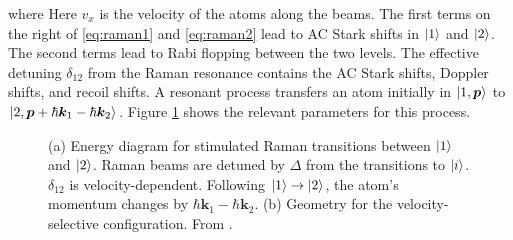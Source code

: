 \documentclass[reprint,
nofootinbib,
amsmath,amssymb,
aps]{revtex4-1}
\newcommand{\f}[2]{\frac{#1}{#2}}
\newcommand{\lb}{\left[}
\newcommand{\rb}{\right]}
\begin{document}
where  
Here $v_x$ is the velocity of the atoms along the beams. The first terms on the right of \eqref{eq:raman1} and \eqref{eq:raman2} lead to AC Stark shifts in $\ket{1}$ and $\ket{2}$. The second terms lead to Rabi flopping between the two levels. The effective detuning $\delta_{12}$ from the Raman resonance contains the AC Stark shifts, Doppler shifts, and recoil shifts. A resonant process transfers an atom initially in $\ket{1,\bm{p}}$ to $\ket{2, \bm{p} + \hbar \bm{k}_1 - \hbar \bm{k}_2}$. Figure \ref{fig:Raman} shows the relevant parameters for this process. 
 

\begin{figure}
	\quad
	\caption{(a) Energy diagram for stimulated Raman transitions between $\ket{1}$ and $\ket{2}$. Raman beams are detuned by $\Delta$ from the transitions to $\ket{i}$. $\delta_{12}$ is velocity-dependent. Following $\ket{1} \to \ket{2}$, the atom's momentum changes by $\hbar \bm{k}_1 - \hbar \bm{k}_2$. (b) Geometry for the velocity-selective configuration. From \cite{kasevich1992measurement}.}
	\label{fig:Raman}
\end{figure}
\end{document}
